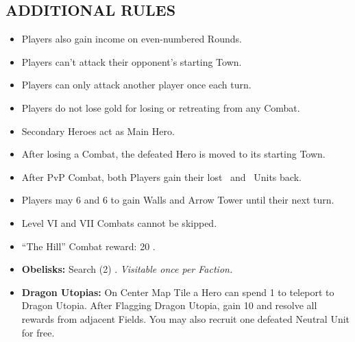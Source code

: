 \begin{multicols}{2}
\subsection*{\MakeUppercase{Additional Rules}}
\begin{itemize}
  \item Players also gain income on even-numbered Rounds.
  \item Players can't attack their opponent's starting Town.
  \item Players can only attack another player once each turn.
  \item Players do not lose gold for losing or retreating from any Combat.
  \item Secondary Heroes act as Main Hero.
  \item After losing a Combat, the defeated Hero is moved to its starting Town.
  \item After PvP Combat, both Players gain their lost \bronze\ and \silver\ Units back.
  \item Players may  6  and 6  to gain Walls and Arrow Tower until their next turn.
  \item Level VI and VII Combats cannot be skipped.
  \item ``The Hill'' Combat reward: 20 .
  \item \textbf{Obelisks:} Search (2) . \textit{Visitable once per Faction.}
  \item \textbf{Dragon Utopias:} On Center Map Tile a Hero can spend 1  to teleport to Dragon Utopia. After Flagging Dragon Utopia, gain 10  and resolve all rewards from adjacent Fields. You may also recruit one defeated Neutral Unit for free.
\end{itemize}


\end{multicols}
